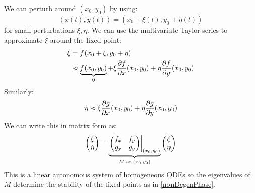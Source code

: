 \documentclass[../main.tex]{subfiles}
\begin{document}
We can perturb around $(x_0, y_0)$ by using:
\[
  (x(t), y(t)) = (x_0 + \xi(t), y_0 + \eta(t))
\]
for small perturbations $\xi, \eta$.
We can use the multivariate Taylor series to approximate $\dot{\xi}$  around the fixed point:
\begin{align*}
  \dot{\xi} &= f(x_0 + \xi, y_0 + \eta) \\
            &\approx \underbrace{f(x_0, y_0)}_{0} + \xi \pderiv{f}{x}(x_0, y_0) + \eta \pderiv{f}{y}(x_0, y_0)
\end{align*}
Similarly:
\[
  \dot{\eta} \approx \xi \pderiv{g}{x}(x_0, y_0) + \eta \pderiv{g}{y}(x_0, y_0)
\]
We can write this in matrix form as:
\[
  \begin{pmatrix}
  \dot{\xi} \\
  \dot{\eta} \\
  \end{pmatrix} =
  \underbrace{\left. \begin{pmatrix}
    f_x & f_y \\
    g_x & g_y \\
    \end{pmatrix} \right|_{(x_0, y_0)}}_{M \text{ at } (x_0, y_0)}
  \begin{pmatrix}
  \xi \\
  \eta \\
  \end{pmatrix}
\]
This is a linear autonomous system of homogeneous ODEs so the eigenvalues of $M$ determine the stability of the fixed points as in \cref{nonDegenPhase}.
\end{document}
